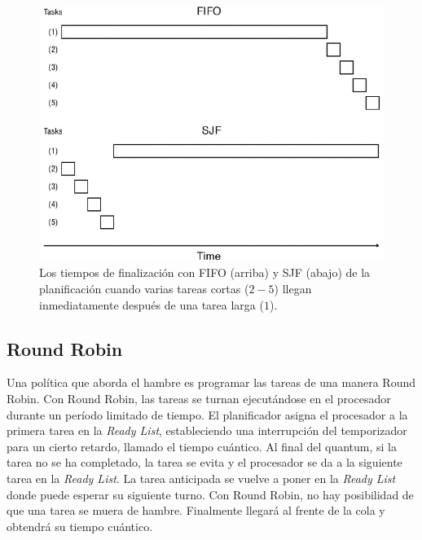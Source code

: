 \documentclass[10pt]{book}
\begin{document}
\begin{figure}[tbhp]
\centerline{\includegraphics[scale=0.70]{img/fig0701}}
\caption{Los tiempos de finalización con FIFO (arriba) y SJF (abajo) de la planificación cuando varias tareas cortas ($2-5$) llegan inmediatamente después de una tarea larga ($1$).}
\label{fig0701}
\end{figure}

\subsection{Round Robin}
Una política que aborda el hambre es programar las tareas de una manera Round Robin. Con Round Robin, las tareas se turnan ejecutándose en el procesador durante un período limitado de tiempo. El planificador asigna el procesador a la primera tarea en la \textit{Ready List}, estableciendo una interrupción del temporizador para un cierto retardo, llamado el tiempo cuántico. Al final del quantum, si la tarea no se ha completado, la tarea se evita y el procesador se da a la siguiente tarea en la \textit{Ready List}. La tarea anticipada se vuelve a poner en la \textit{Ready List} donde puede esperar su siguiente turno. Con Round Robin, no hay posibilidad de que una tarea se muera de hambre. Finalmente llegará al frente de la cola y obtendrá su tiempo cuántico.
\end{document}
